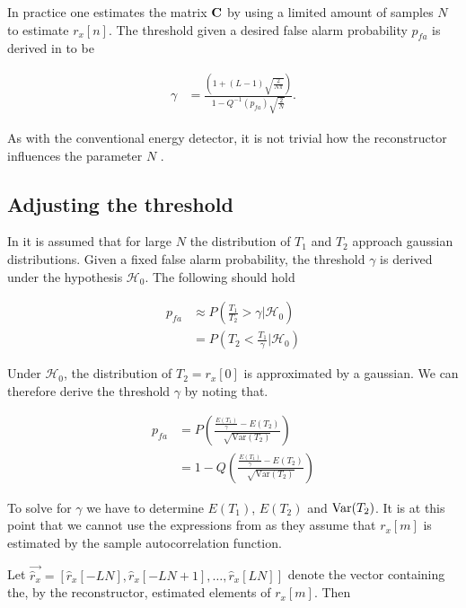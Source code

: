 \documentclass[a4paper, openany, oneside]{memoir}
\begin{document}
In practice one estimates the matrix $\boldsymbol{\mathbf{C}}$ by using a limited amount of samples $N$ to estimate $r_x[n]$. The threshold given a desired false alarm probability
$p_{fa}$ is derived in \cite{zheng2009spectrum} to be

\begin{align*}
\gamma &= \frac{\left(1+(L-1)\sqrt{\frac{2}{N\pi}}\right)}{1-Q^{-1}(p_{fa})\sqrt{\frac{2}{N}}}.
\end{align*} 

As with the conventional energy detector, it is not trivial how the reconstructor influences the parameter $N$ .

\subsection{Adjusting the threshold}

In \cite{zheng2009spectrum} it is assumed that for large $N$ the distribution of $T_1$ and $T_2$ approach gaussian distributions. Given a fixed false alarm probability, the threshold $\gamma$ is derived under the hypothesis $\mathcal{H}_0$. The following should hold

\begin{align*}
p_{fa} &\approx P\left(\frac{T_1}{T_2} > \gamma \big | \mathcal{H}_0\right) \\
&= P\left(T_2 < \frac{T_1}{\gamma} \big | \mathcal{H}_0\right)
\end{align*}

Under $\mathcal{H}_0$, the distribution of $T_2 = r_x[0]$ is approximated by a gaussian. We can therefore derive the
threshold $\gamma$ by noting that.

\begin{align*}
p_{fa} &= P\left(\frac{\frac{E\left(T_1\right)}{\gamma} - E\left(T_2\right) }{\sqrt{\text{Var}(T_2)}}\right)\\
&= 1-Q\left(\frac{\frac{E\left(T_1\right)}{\gamma} - E\left(T_2\right) }{\sqrt{\text{Var}(T_2)}}\right) 
\end{align*}

To solve for $\gamma$ we have to determine $E\left(T_1\right)$, $E\left(T_2\right)$ and $\operatorname{Var}(T_2)$. It is at this point that we cannot use the expressions from \cite{zheng2009spectrum} as they assume that $r_x[m]$ is estimated by the sample autocorrelation function. 

Let $\vec{\hat{r}_x} = \left[\hat{r}_x[-LN], \hat{r}_x[-LN+1] , \ldots, \hat{r}_x[LN]\right]$ denote the vector containing the, by the reconstructor, estimated elements of $r_x[m]$. Then 
\end{document}
